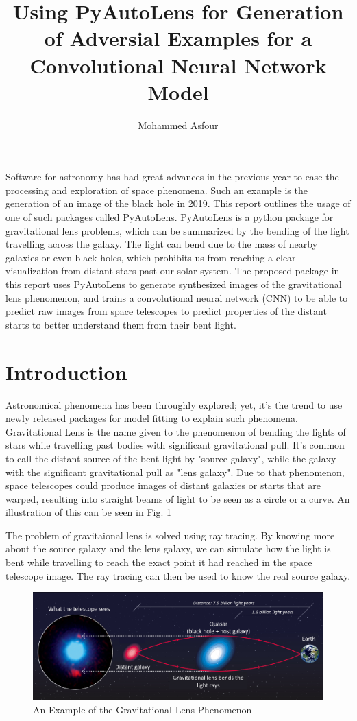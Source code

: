 \documentclass[12pt]{article}
\title{Using PyAutoLens for Generation of Adversial Examples for a Convolutional Neural Network Model}
\author{Mohammed Asfour}
\begin{document}
\maketitle

\abstract%
Software for astronomy has had great advances in the previous year to ease the processing and exploration of space phenomena. Such an example is the generation of an image of the black hole in 2019. This report outlines the usage of one of such packages called PyAutoLens. PyAutoLens is a python package for gravitational lens problems, which can be summarized by the bending of the light travelling across the galaxy. The light can bend due to the mass of nearby galaxies or even black holes, which prohibits us from reaching a clear visualization from distant stars past our solar system. The proposed package in this report uses PyAutoLens to generate synthesized images of the gravitational lens phenomenon, and trains a convolutional neural network (CNN) to be able to predict raw images from space telescopes to predict properties of the distant starts to better understand them from their bent light.

\section{Introduction}
Astronomical phenomena has been throughly explored\cite{astro5}\cite{astro3}\cite{astro4}; yet, it's the trend to use newly released packages for model fitting to explain such phenomena\cite{astro1}\cite{astro2}.
Gravitational Lens is the name given to the phenomenon of bending the lights of stars while travelling past bodies with significant gravitational pull. It's common to call the distant source of the bent light by "source galaxy", while the galaxy with the significant gravitational pull as "lens galaxy". Due to that phenomenon, space telescopes could produce images of distant galaxies or starts that are warped, resulting into straight beams of light to be seen as a circle or a curve. An illustration of this can be seen in Fig. \ref{fig:grav}

The problem of gravitaional lens is solved using ray tracing. By knowing more about the source galaxy and the lens galaxy, we can simulate how the light is bent while travelling to reach the exact point it had reached in the space telescope image. The ray tracing can then be used to know the real source galaxy.


\begin{figure}[thb]
    \centering
    \includegraphics[width=\textwidth]{grav_lens.jpeg}
    \caption{An Example of the Gravitational Lens Phenomenon}
    \label{fig:grav}
\end{figure}
\end{document}
